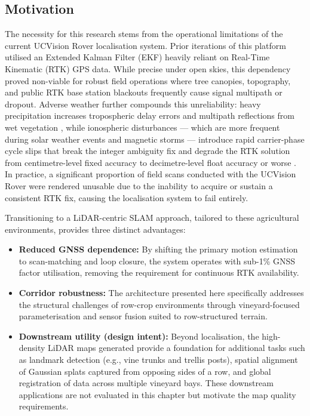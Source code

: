 \subsection{Motivation}
\label{subsec:slam-motivation}
The necessity for this research stems from the operational limitations of the current UCVision Rover localisation system. Prior iterations of this platform utilised an Extended Kalman Filter (EKF) heavily reliant on Real-Time Kinematic (RTK) GPS data. While precise under open skies, this dependency proved non-viable for robust field operations where tree canopies, topography, and public RTK base station blackouts frequently cause signal multipath or dropout. Adverse weather further compounds this unreliability: heavy precipitation increases tropospheric delay errors \cite{solheimPropagationDelaysGPSSignals1999} and multipath reflections from wet vegetation \cite{nievinskiForwardModelingGPSMultipath2014}, while ionospheric disturbances — which are more frequent during solar weather events and magnetic storms — introduce rapid carrier-phase cycle slips that break the integer ambiguity fix and degrade the RTK solution from centimetre-level fixed accuracy to decimetre-level float accuracy or worse \cite{wielgoszAnalysisNetworkRTKIonospheric2005}. In practice, a significant proportion of field scans conducted with the UCVision Rover were rendered unusable due to the inability to acquire or sustain a consistent RTK fix, causing the localisation system to fail entirely.

Transitioning to a LiDAR-centric SLAM approach, tailored to these agricultural environments, provides three distinct advantages:
\begin{itemize}
	\item \textbf{Reduced GNSS dependence:} By shifting the primary motion estimation to scan-matching and loop closure, the system operates with sub-1\% GNSS factor utilisation, removing the requirement for continuous RTK availability.
	\item \textbf{Corridor robustness:} The architecture presented here specifically addresses the structural challenges of row-crop environments through vineyard-focused parameterisation and sensor fusion suited to row-structured terrain.
	\item \textbf{Downstream utility (design intent):} Beyond localisation, the high-density LiDAR maps generated provide a foundation for additional tasks such as landmark detection (e.g., vine trunks and trellis posts), spatial alignment of Gaussian splats captured from opposing sides of a row, and global registration of data across multiple vineyard bays. These downstream applications are not evaluated in this chapter but motivate the map quality requirements.
\end{itemize}
